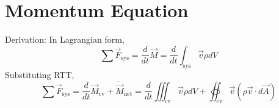 \documentclass[12pt]{article}
\begin{document}
\section{Momentum Equation}

Derivation: In Lagrangian form,
$$\sum \vec{F}_\mathrm{sys} = \frac{d}{dt}\vec{M} = \frac{d}{dt} \int_\mathrm{sys} \vec{v}\rho dV$$
Substituting RTT,
$$\sum \vec{F}_\mathrm{sys} = \frac{d}{dt}\vec{M}_\mathrm{cv} + \dot{\vec{M}}_\mathrm{net} = \frac{d}{dt} \iiint_\mathrm{cv} \vec{v}\rho dV + \oiint_\mathrm{cv} \vec{v}\left(\rho\vec{v}\cdot d\vec{A}\right)$$
\end{document}
